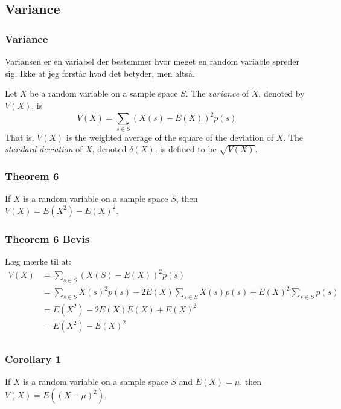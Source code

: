 \documentclass{beamer}
\begin{document}
\subsection{Variance}
\label{subsec:variance}

\begin{frame}
  \frametitle{Variance}
  Variansen er en variabel der bestemmer hvor meget en random variable spreder sig. Ikke at jeg forstår hvad det betyder, men altså.
  \begin{definition}
    Let $X$ be a random variable on a sample space $S$. The \textit{variance} of $X$, denoted by $V(X)$, is
    \[ V(X) = \sum_{s\in S}^{} (X(s) - E(X))^{2}p(s) \]
    That is, $V(X)$ is the weighted average of the square of the deviation of $X$. The \textit{standard deviation} of $X$, denoted $\delta(X)$, is defined to be $\sqrt{V(X)}$.
  \end{definition}
  
\end{frame}

\begin{frame}
  \frametitle{Theorem 6}
  \begin{theorem}[Theorem 6]
If $X$ is a random variable on a sample space $S$, then $V(X) = E(X^{2}) -E(X)^{2}$.
  \end{theorem}
\end{frame}

\begin{frame}
  \frametitle{Theorem 6 Bevis}
  Læg mærke til at:
  \begin{equation*}
    \begin{split}
      V(X) &= \sum_{s \in S}^{} (X(S) - E(X))^{2}p(s)\\
           &= \sum_{s \in S}^{} X(s)^{2}p(s) - 2E(X) \sum_{s \in S}^{} X(s)p(s) + E(X)^{2} \sum_{s \in S}^{} p(s)\\
           &= E(X^{2}) - 2E(X)E(X)+E(X)^{2}\\
           &= E(X^{2})-E(X)^{2}\\
    \end{split}
  \end{equation*}
\end{frame}


\begin{frame}
  \frametitle{Corollary 1}
  \begin{corollary}
    If $X$ is a random variable on a sample space $S$ and $E(X) = \mu$, then $V(X) = E((X- \mu)^{2})$.
  \end{corollary} 
\end{frame}
\end{document}
